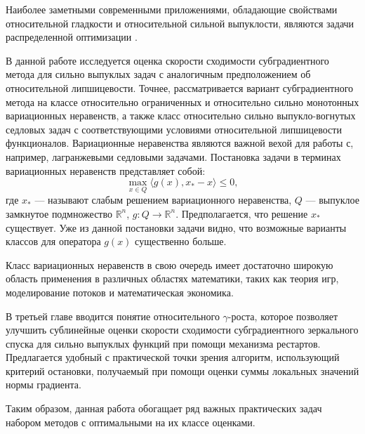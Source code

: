  Наиболее заметными современными приложениями, обладающие свойствами относительной гладкости и относительной сильной выпуклости, являются задачи распределенной оптимизации \cite{Hendr}. 

В данной работе исследуется оценка скорости сходимости субградиентного метода для сильно выпуклых задач с аналогичным предположением об относительной липшицевости. Точнее, рассматривается вариант субградиентного метода на классе относительно ограниченных и относительно сильно монотонных вариационных неравенств, а также класс относительно сильно выпукло-вогнутых седловых задач с соответствующими условиями относительной липшицевости функционалов. Вариационные неравенства являются важной вехой для работы с, например, лагранжевыми седловыми задачами. Постановка задачи в терминах вариационных неравенств представляет собой: 
$$
    \max_{x \in Q} \langle g(x), x_* - x \rangle \leq 0,
$$
где $x_*$ --- называют слабым решением вариационного неравенства, $Q$ --- выпуклое замкнутое подмножество $\mathbb{R}^n$, $g: Q \longrightarrow \mathbb{R}^n$. Предполагается, что решение $x_*$ существует. Уже из данной постановки задачи видно, что возможные варианты классов для оператора $g(x)$ существенно больше.

Класс вариационных неравенств в свою очередь имеет достаточно широкую область применения в различных областях математики, таких как теория игр, моделирование потоков и математическая экономика. 

В третьей главе вводится понятие относительного $\gamma$-роста, которое позволяет улучшить сублинейные оценки скорости сходимости субградиентного зеркального спуска для сильно выпуклых функций при помощи механизма рестартов. Предлагается удобный с практической точки зрения алгоритм, использующий критерий остановки, получаемый при помощи оценки суммы локальных значений нормы градиента. 

Таким образом, данная работа обогащает ряд важных практических задач набором методов с оптимальными на их классе оценками.


